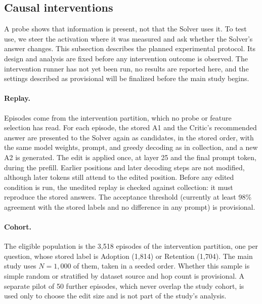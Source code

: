 \subsection{Causal interventions}
\label{sec:method-causal}

A probe shows that information is present, not that the Solver uses it. To
test use, we steer the activation where it was measured and ask whether the
Solver's answer changes. This subsection describes the planned experimental
protocol. Its design and analysis are fixed before any intervention outcome is
observed. The intervention runner has not yet been run, no results are
reported here, and the settings described as provisional will be finalized
before the main study begins.

\paragraph{Replay.} Episodes come from the intervention partition, which no
probe or feature selection has read. For each episode, the stored A1 and the
Critic's recommended answer are presented to the Solver again as candidates,
in the stored order, with the same model weights, prompt, and greedy decoding
as in collection, and a new A2 is generated. The edit is applied once, at
layer 25 and the final prompt token, during the prefill. Earlier positions and
later decoding steps are not modified, although later tokens still attend to
the edited position. Before any edited condition is run, the unedited replay
is checked against collection: it must reproduce the stored answers. The
acceptance threshold (currently at least 98\% agreement with the stored labels
and no difference in any prompt) is provisional.

\paragraph{Cohort.} The eligible population is the 3{,}518 episodes of the
intervention partition, one per question, whose stored label is Adoption
(1{,}814) or Retention (1{,}704). The main study uses $N = 1{,}000$ of them,
taken in a seeded order. Whether this sample is simple random or stratified by
dataset source and hop count is provisional. A separate pilot of 50 further
episodes, which never overlap the study cohort, is used only to choose the
edit size and is not part of the study's analysis.

